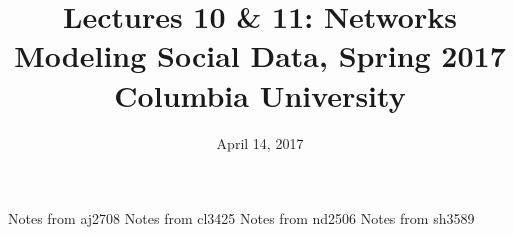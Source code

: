 \documentclass{article}
\title{
Lectures 10 \& 11: Networks \\  %
Modeling Social Data, Spring 2017 \\   %
Columbia University                    %
}
\date{April 14, 2017}                %
\makeatletter
\let\org@subfile
\renewcommand*{}[1]{%
  \filename@parse{#1}%
  \expandafter
  \graphicspath\expandafter{\expandafter{\filename@area}}%
  \org@subfile{#1}%
}
\makeatother
\begin{document}
\maketitle


\pagebreak \newpage \noindent\Huge{Notes from aj2708} \normalsize \setcounter{section}{0} 
\pagebreak \newpage \noindent\Huge{Notes from cl3425} \normalsize \setcounter{section}{0} 
\pagebreak \newpage \noindent\Huge{Notes from nd2506} \normalsize \setcounter{section}{0} 
\pagebreak \newpage \noindent\Huge{Notes from sh3589} \normalsize \setcounter{section}{0} 
\end{document}
